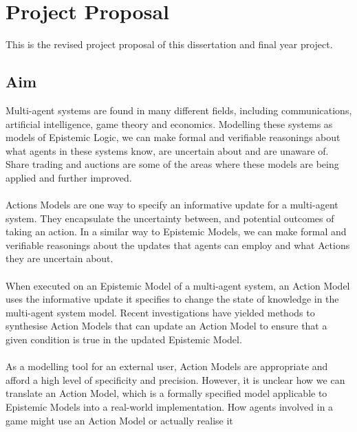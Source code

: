 \chapter{Project Proposal}

This is the revised project proposal of this dissertation and final year project.

\section{Aim}
Multi-agent systems are found in many different fields, including
communications, artificial intelligence, game theory and economics.
Modelling these systems as models of Epistemic Logic, we can make formal and
verifiable reasonings about what agents in these systems know, are uncertain
about and are unaware of.
Share trading and auctions are some of the areas where these models are being
applied and further improved.\\
\\
Actions Models are one way to specify an informative update for a multi-agent
system.
They encapsulate the uncertainty between, and potential outcomes of taking an
action.
In a similar way to Epistemic Models, we can make formal and verifiable
reasonings about the updates that agents can employ and what Actions they are
uncertain about.\\
\\
When executed on an Epistemic Model of a multi-agent system, an Action Model
uses the informative update it specifies to change the state of knowledge in the
multi-agent system model.
Recent investigations have yielded methods to synthesise Action Models that can
update an Action Model to ensure that a given condition is true in the updated
Epistemic Model.\\
\\
As a modelling tool for an external user, Action Models are appropriate and
afford a high level of specificity and precision.
However, it is unclear how we can translate an Action Model, which is a formally
specified model applicable to Epistemic Models into a real-world implementation.
How agents involved in a game might use an Action Model or actually realise it
